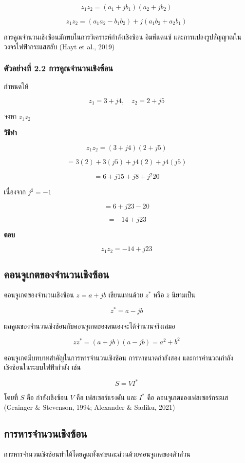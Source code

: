 \[
z_1z_2=(a_1+jb_1)(a_2+jb_2)
\]

\[
z_1z_2=(a_1a_2-b_1b_2)+j(a_1b_2+a_2b_1)
\]

การคูณจำนวนเชิงซ้อนมักพบในการวิเคราะห์กำลังเชิงซ้อน อิมพีแดนซ์ และการแปลงรูปสัญญาณในวงจรไฟฟ้ากระแสสลับ (Hayt et al., 2019)

\subsubsection*{ตัวอย่างที่ 2.2 การคูณจำนวนเชิงซ้อน}

กำหนดให้

\[
z_1=3+j4,\quad z_2=2+j5
\]

จงหา $z_1z_2$

\textbf{วิธีทำ}

\[
z_1z_2=(3+j4)(2+j5)
\]

\[
=3(2)+3(j5)+j4(2)+j4(j5)
\]

\[
=6+j15+j8+j^2 20
\]

เนื่องจาก $j^2=-1$

\[
=6+j23-20
\]

\[
=-14+j23
\]

\textbf{ตอบ}

\[
z_1z_2=-14+j23
\]

\subsection{คอนจูเกตของจำนวนเชิงซ้อน}

คอนจูเกตของจำนวนเชิงซ้อน $z=a+jb$ เขียนแทนด้วย $z^*$ หรือ $\overline{z}$ นิยามเป็น

\[
z^*=a-jb
\]

ผลคูณของจำนวนเชิงซ้อนกับคอนจูเกตของตนเองจะได้จำนวนจริงเสมอ

\[
zz^*=(a+jb)(a-jb)=a^2+b^2
\]

คอนจูเกตมีบทบาทสำคัญในการหารจำนวนเชิงซ้อน การหาขนาดกำลังสอง และการคำนวณกำลังเชิงซ้อนในระบบไฟฟ้ากำลัง เช่น

\[
S=VI^*
\]

โดยที่ $S$ คือ กำลังเชิงซ้อน $V$ คือ เฟสเซอร์แรงดัน และ $I^*$ คือ คอนจูเกตของเฟสเซอร์กระแส (Grainger \& Stevenson, 1994; Alexander \& Sadiku, 2021)

\subsection{การหารจำนวนเชิงซ้อน}

การหารจำนวนเชิงซ้อนทำได้โดยคูณทั้งเศษและส่วนด้วยคอนจูเกตของตัวส่วน

